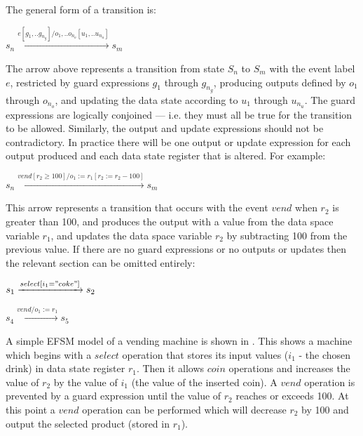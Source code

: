 The general form of a transition is: 

\begin{center}
$s_n \xrightarrow{e[g_1, .. g_{n_g}]/o_1, .. o_{n_o} [u_1, .. u_{n_u}]} s_m$ 
\end{center}

The arrow above represents a transition from state $S_n$ to $S_m$ with the event label $e$, restricted by guard expressions $g_1$ through $g_{n_g}$, producing outputs defined by $o_1$ through $o_{n_o}$, and updating the data state according to $u_1$ through $u_{n_u}$. The guard expressions are logically conjoined --- i.e. they must all be true for the transition to be allowed. Similarly, the output and update expressions should not be contradictory. In practice there will be one output or update expression for each output produced and each data state register that is altered. For example:

\begin{center}
$s_n \xrightarrow{vend[r_{2} \geq 100]/o_{1} :=r_{1}[r_{2} := r_{2} - 100]} s_m$
\end{center}

This arrow represents a transition that occurs with the event $vend$ when $r_2$ is greater than 100, and produces the output with a value from the data space variable $r_1$, and updates the data space variable $r_2$ by subtracting 100 from the previous value. If there are no guard expressions or no outputs or updates then the relevant section can be omitted entirely:

\begin{center}
$s_1 \xrightarrow{select[i_{1}="coke"]} s_2$

$s_4 \xrightarrow{vend/o_{1} := r_{1}} s_5$
\end{center}

A simple EFSM model of a vending machine is shown in . This shows a machine which begins with a $select$ operation that stores its input values ($i_1$ - the chosen drink) in data state register $r_1$. Then it allows $coin$ operations and increases the value of $r_2$ by the value of $i_1$ (the value of the inserted coin). A $vend$ operation is prevented by a guard expression until the value of $r_2$ reaches or exceeds 100. At this point a $vend$ operation can be performed which will decrease $r_2$ by 100 and output the selected product (stored in $r_1$).

